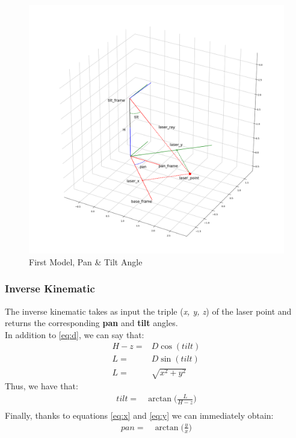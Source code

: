 \begin{figure}
	\centering
	\includegraphics[width=\textwidth]{img/model1XY.png}%
	\caption{First Model, Pan \& Tilt Angle}
	\label{fig:firstModelPanTilt}
\end{figure}
\subsubsection{Inverse Kinematic}
The inverse kinematic takes as input the triple (\textit{x, y, z}) of the laser point and returns the corresponding \textbf{pan} and \textbf{tilt} angles.\\
In addition to \ref{eq:d}, we can say that:
\begin{align}
    H-z =& D\cos(tilt)\\
	L =& D\sin(tilt) \label{eq:dsin}\\
	L=& \sqrt{x^2+y^2}
\end{align}
Thus, we have that:
\begin{align}
    tilt =& \arctan\bigg(\frac{L}{H-z}\bigg) \label{eq:tiltik}\\
\end{align}
Finally, thanks to equations \ref{eq:x} and \ref{eq:y} we can immediately obtain:
\begin{align}
	pan=& \arctan\bigg(\frac{y}{x}\bigg)\label{eq:panik}
\end{align}
\\
